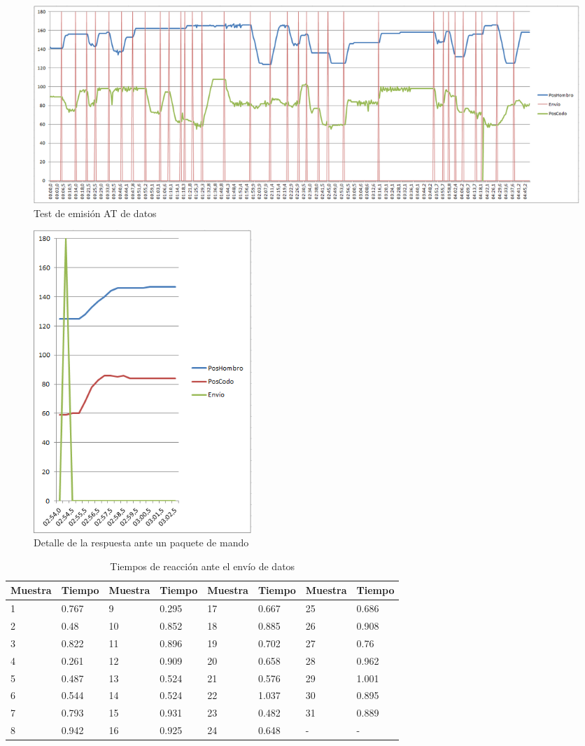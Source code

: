 \begin{figure}[H]
\centering
\includegraphics[width=1.1\textwidth]{figuras/temat.png}
\caption{Test de emisión AT de datos}
\end{figure}

\begin{figure}[H]
\centering
\includegraphics[width=0.4\textwidth]{figuras/tresp.png}
\caption{Detalle de la respuesta ante un paquete de mando}
\end{figure}

\begin{table}[H]
\begin{center}
\begin{tabular}{|m{15mm}|m{15mm}||m{15mm}|m{15mm}||m{15mm}|m{15mm}||m{15mm}|m{15mm}|}
\hline
\textbf{Muestra} & \textbf{Tiempo} & \textbf{Muestra} & \textbf{Tiempo} & \textbf{Muestra} & \textbf{Tiempo} & \textbf{Muestra} & \textbf{Tiempo}\\
\hline
1 & 0.767 & 9 & 0.295 & 17 & 0.667 & 25 & 0.686\\
\hline
2 & 0.48 & 10 & 0.852 & 18 & 0.885 & 26 & 0.908\\
\hline
3 & 0.822 & 11 & 0.896 & 19 & 0.702 & 27 & 0.76\\
\hline
4 & 0.261 & 12 & 0.909 & 20 & 0.658 & 28 & 0.962\\
\hline
5 & 0.487 & 13 & 0.524 & 21 & 0.576 & 29 & 1.001\\
\hline
6 & 0.544 & 14 & 0.524 & 22 & 1.037 & 30 & 0.895\\
\hline
7 & 0.793 & 15 & 0.931 & 23 & 0.482 & 31 & 0.889\\
\hline
8 & 0.942 & 16 & 0.925 & 24 & 0.648 & - & -\\
\hline
\end{tabular}
\end{center}
\caption{Tiempos de reacción ante el envío de datos}
\label{tab:treac}
\end{table}

